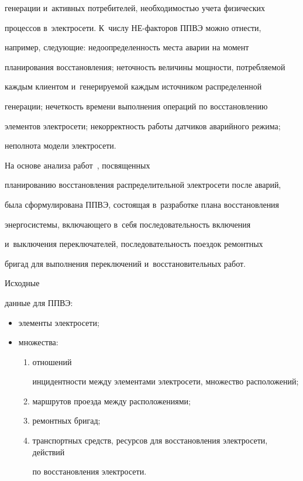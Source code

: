 генерации и~активных потребителей, необходимостью учета физических 


процессов в~электросети. К~числу НЕ-фак\-то\-ров ППВЭ можно отнести, 


например, следующие: недоопределенность места аварии на момент 


планирования восстановления; неточность величины мощности, потребляемой 


каждым клиентом и~генерируемой каждым источником распределенной 


генерации; нечеткость времени выполнения операций по восстановлению 


элементов электросети; некорректность работы датчиков аварийного режима; 


неполнота модели электросети.


  


  На основе анализа работ~\cite{1-kl, 12-kl, 14-kl, 15-kl, 16-kl}, посвященных 


планированию восстановления распределительной электросети после аварий, 


была сформулирована ППВЭ, состоящая в~разработке плана восстановления 


энергосистемы, включающего в~себя последовательность включения 


и~выключения переключателей, последовательность поездок ремонтных 


бригад для выполнения переключений и~восстановительных работ. 





Исходные 


данные для ППВЭ: 


\begin{itemize}


\item элементы электросети; 


\item множества:


\begin{enumerate}[(1)]


\item отношений 


инцидентности между элементами электросети, множество расположений; 


\item  маршрутов проезда между расположениями; 


\item ремонтных бригад; 


\item транспортных средств, ресурсов для восстановления электросети, действий 


по восстановления электросети.\end{enumerate}


\end{itemize}





